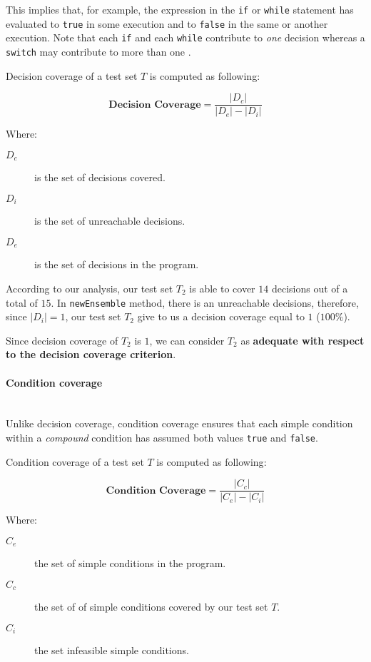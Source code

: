 \documentclass[sigconf]{acmart}
\newcommand{\abs}[1]{\left|#1\right|}
\begin{document}
This implies that, for example, the expression in the \texttt{if} or \texttt{while} statement has evaluated to \texttt{true} in some execution and to \texttt{false} in the same or another execution. Note that each \texttt{if} and each \texttt{while} contribute to \textit{one} decision whereas a \texttt{switch} may contribute to more than one \cite{AngelisBook}.

Decision coverage of a test set $T$ is computed as following\cite{AngelisBook}:

\begin{equation} 
\label{DecisionCoverage}
\textbf{Decision Coverage} = \dfrac{\abs{D_c}}{\abs{D_e} - \abs{D_i}}
\end{equation}

Where:
\begin{description}
\item[$D_c$] is the set of decisions covered.
\item[$D_i$] is the set of unreachable decisions.
\item[$D_e$] is the set of decisions in the program.
\end{description}


According to our analysis, our test set $T_2$ is able to cover $14$ decisions out of a total of $15$. In \texttt{newEnsemble} method, there is an unreachable decisions, therefore, since $\abs{D_i} = 1$, our test set $T_2$ give to us a decision coverage equal to $1$ ($100\%$).

Since decision coverage of $T_2$ is $1$, we can consider $T_2$ as \textbf{adequate with respect to the decision coverage criterion}.

\paragraph{Condition coverage}
\hfill\\
Unlike decision coverage, condition coverage ensures that each simple condition within a \textit{compound} condition has assumed both values \texttt{true} and \texttt{false}\cite{AngelisBook}. 

Condition coverage of a test set $T$ is computed as following\cite{AngelisBook}:

\begin{equation} 
\label{ConditionCoverage}
\textbf{Condition Coverage} = \dfrac{\abs{C_c}}{\abs{C_e} - \abs{C_i}}
\end{equation}

Where:

\begin{description}
\item[$C_e$] the set of simple conditions in the program.
\item[$C_c$] the set of of simple conditions covered  by our test set $T$.
\item[$C_i$] the set infeasible simple conditions.
\end{description}
\end{document}
